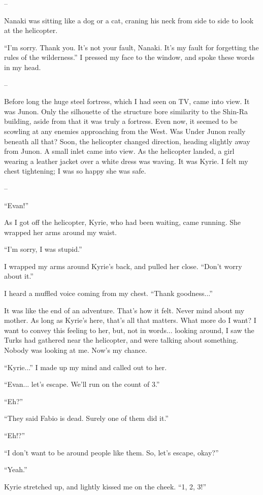 \documentclass[oneside]{book}
\begin{document}
–

Nanaki was sitting like a dog or a cat, craning his neck from side to side to look at the helicopter.

“I’m sorry. Thank you. It’s not your fault, Nanaki. It’s my fault for forgetting the rules of the wilderness.” I pressed my face to the window, and spoke these words in my head.

–

Before long the huge steel fortress, which I had seen on TV, came into view. It was Junon. Only the silhouette of the structure bore similarity to the Shin-Ra building, aside from that it was truly a fortress. Even now, it seemed to be scowling at any enemies approaching from the West. Was Under Junon really beneath all that? Soon, the helicopter changed direction, heading slightly away from Junon. A small inlet came into view. As the helicopter landed, a girl wearing a leather jacket over a white dress was waving. It was Kyrie. I felt my chest tightening; I was so happy she was safe.

–

“Evan!”

As I got off the helicopter, Kyrie, who had been waiting, came running. She wrapped her arms around my waist.

“I’m sorry, I was stupid.”

I wrapped my arms around Kyrie’s back, and pulled her close. “Don’t worry about it.”

I heard a muffled voice coming from my chest. “Thank goodness...”

It was like the end of an adventure. That’s how it felt. Never mind about my mother. As long as Kyrie’s here, that’s all that matters. What more do I want? I want to convey this feeling to her, but, not in words... looking around, I saw the Turks had gathered near the helicopter, and were talking about something. Nobody was looking at me. Now’s my chance.

“Kyrie...” I made up my mind and called out to her.

“Evan... let’s escape. We’ll run on the count of 3.”

“Eh?”

“They said Fabio is dead. Surely one of them did it.”

“Eh!?”

“I don’t want to be around people like them. So, let’s escape, okay?”

“Yeah.”

Kyrie stretched up, and lightly kissed me on the cheek. “1, 2, 3!”
\end{document}
